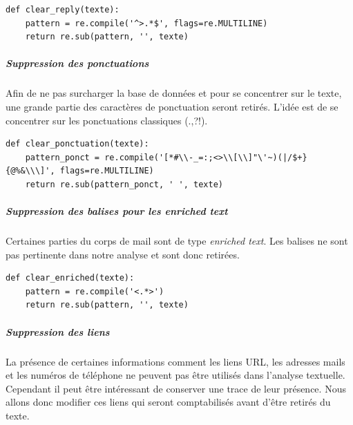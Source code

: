 \documentclass[a4paper,12pt]{article}
\begin{document}
					\begin{lstlisting}[title=Nettoyage des réponses]
def clear_reply(texte):
    pattern = re.compile('^>.*$', flags=re.MULTILINE)
    return re.sub(pattern, '', texte) \end{lstlisting}
					
				\subparagraph{Suppression des ponctuations} Afin de ne pas surcharger la base de données et pour se concentrer sur le texte, une grande partie des caractères de ponctuation seront retirés. L'idée est de se concentrer sur les ponctuations classiques (.,?!).

					\begin{lstlisting}[title=Nettoyage des ponctuations]				
def clear_ponctuation(texte):
    pattern_ponct = re.compile('[*#\\-_=:;<>\\[\\]"\'~)(|/$+}{@%&\\\]', flags=re.MULTILINE)
    return re.sub(pattern_ponct, ' ', texte) \end{lstlisting}

				\subparagraph{Suppression des balises pour les enriched text} Certaines parties du corps de mail sont de type \emph{enriched text}. Les balises ne sont pas pertinente dans notre analyse et sont donc retirées.
						
					\begin{lstlisting}[title=Nettoyage des balises enriched text]
def clear_enriched(texte):
    pattern = re.compile('<.*>')
    return re.sub(pattern, '', texte) \end{lstlisting}
						
				\subparagraph{Suppression des liens} La présence de certaines informations comment les liens URL, les adresses mails et les numéros de téléphone ne peuvent pas être utilisés dans l'analyse textuelle. Cependant il peut être intéressant de conserver une trace de leur présence. Nous allons donc modifier ces liens qui seront comptabilisés avant d'être retirés du texte.
				
\end{document}
